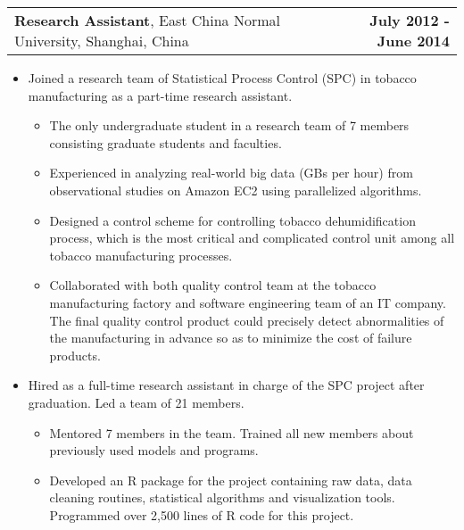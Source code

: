\documentclass[11pt]{article}
\makeatletter
\newcommand{\headerrow}[2]
{\begin{tabular*}{\linewidth}{l@{\extracolsep{\fill}}r}
	#1 & #2 \\
\end{tabular*}
}
\makeatother
\begin{document}
\noindent\headerrow
{\textbf{Research Assistant}, East China Normal University, Shanghai, China}
{\textbf{July 2012 - June 2014}}
\begin{itemize}
	\item Joined a research team of Statistical Process Control (SPC) in tobacco manufacturing as a part-time research assistant.
	\begin{itemize}
		\item The only undergraduate student in a research team of 7 members consisting graduate students and faculties.
		\item Experienced in analyzing real-world big data (GBs per hour) from observational studies on Amazon EC2 using parallelized algorithms.
		\item Designed a control scheme for controlling tobacco dehumidification process, which is the most critical and complicated control unit among all tobacco manufacturing processes.
		\item Collaborated with both quality control team at the tobacco manufacturing factory and software engineering team of an IT company. The final quality control product could precisely detect abnormalities of the manufacturing in advance so as to minimize the cost of failure products.
	\end{itemize}

	\item Hired as a full-time research assistant in charge of the SPC project after graduation. Led a team of 21 members.
	\begin{itemize}
		\item Mentored 7 members in the team. Trained all new members about previously used models and programs.
		\item Developed an R package for the project containing raw data, data cleaning routines, statistical algorithms and visualization tools. Programmed over 2,500 lines of R code for this project.
	\end{itemize}

\end{itemize}
\end{document}
